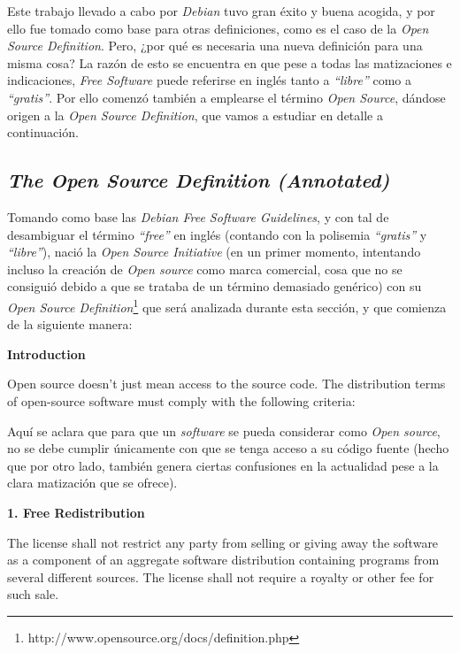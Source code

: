 Este trabajo llevado a cabo por \textit{Debian} tuvo gran éxito y buena acogida,
y por ello fue tomado como base para otras definiciones, como es el caso de
la \textit{Open Source Definition}. Pero, ¿por qué es necesaria una nueva
definición para una misma cosa? La razón de esto se encuentra en que pese a
todas las matizaciones e indicaciones, \textit{Free Software} puede referirse en
inglés tanto a \textit{``libre''} como a \textit{``gratis''}. Por ello comenzó
también a emplearse el término \textit{Open Source}, dándose origen a la
\textit{Open Source Definition}, que vamos a estudiar en detalle a continuación.

\subsection{\textit{The Open Source Definition (Annotated)}}

Tomando como base las \textit{Debian Free Software Guidelines}, y con tal de
desambiguar el término \textit{``free''} en inglés (contando con la polisemia
\textit{``gratis''} y \textit{``libre''}), nació la \textit{Open Source
Initiative} (en un primer momento, intentando incluso la creación de
\textit{Open source} como marca comercial, cosa que no se consiguió debido a que
se trataba de un término demasiado genérico) con su \textit{Open Source
Definition}\footnote{ http://www.opensource.org/docs/definition.php } que será
analizada durante esta sección, y que comienza de la siguiente
manera:\vspace{0.4cm}

{\bf Introduction

Open source doesn't just mean access to the source code. The distribution terms
of open-source software must comply with the following criteria:}\vspace{0.4cm}

Aquí se aclara que para que un \textit{software} se pueda considerar como
\textit{Open source}, no se debe cumplir únicamente con que se tenga acceso a su
código fuente (hecho que por otro lado, también genera ciertas confusiones en la
actualidad pese a la clara matización que se ofrece).\vspace{0.4cm}

{\bf 1. Free Redistribution

The license shall not restrict any party from selling or giving away the
software as a component of an aggregate software distribution containing
programs from several different sources. The license shall not require a royalty
or other fee for such sale.}

